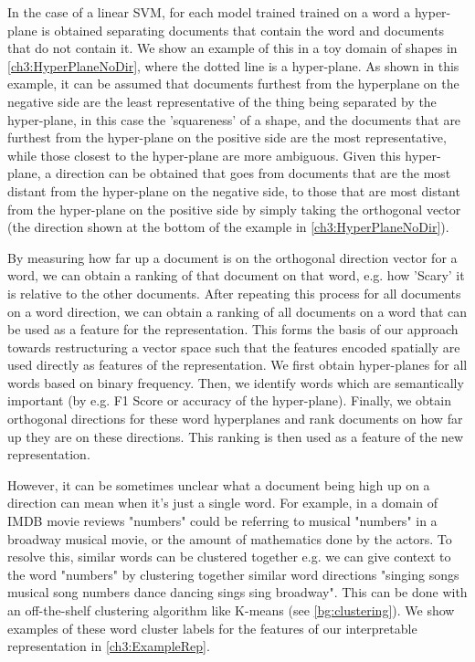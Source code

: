  In the case of a linear SVM, for each model trained trained on a word a hyper-plane is obtained separating documents that contain the word and documents that do not contain it. We show an example of this in a toy domain of shapes in \ref{ch3:HyperPlaneNoDir}, where the dotted line is a hyper-plane. As shown in this example, it can be assumed that documents furthest from the hyperplane on the negative side are the least representative of the thing being separated by the hyper-plane, in this case the 'squareness' of a shape, and the documents that are furthest from the hyper-plane on the positive side are the most representative, while those closest to the hyper-plane are more ambiguous. Given this hyper-plane, a direction can be obtained  that goes from documents that are the most distant from the hyper-plane on the negative side, to those that are most distant from the hyper-plane on the positive side by simply taking the orthogonal vector (the direction shown at the bottom of the example in \ref{ch3:HyperPlaneNoDir}).

By measuring how far up a document is on the orthogonal direction vector for a word, we can obtain a ranking of that document on that word, e.g. how 'Scary' it is relative to the other documents. After repeating this process for all documents on a word direction, we can obtain a ranking of all documents on a word that can be used as a feature for the representation. This forms the basis of our approach towards restructuring a vector space such that the features encoded spatially are used directly as features of the representation. We first obtain hyper-planes for all words based on binary frequency. Then, we identify words which are semantically important (by e.g. F1 Score or accuracy of the hyper-plane). Finally, we obtain orthogonal directions for these word hyperplanes and rank documents on how far up they are on these directions. This ranking is then used as a feature of the new representation.

 However, it can be sometimes unclear what a document being high up on a direction can mean when it's just a single word. For example, in a domain of IMDB movie reviews "numbers" could be referring to musical "numbers" in a broadway musical movie, or the amount of mathematics done by the actors. To resolve this, similar words can be clustered together e.g.  we can give context to the word "numbers" by clustering together similar word directions  "singing songs musical song numbers dance dancing sings sing broadway". This can be done with an off-the-shelf clustering algorithm like K-means (see \ref{bg:clustering}). We show examples of these word cluster labels for the features of our interpretable representation in \ref{ch3:ExampleRep}.

